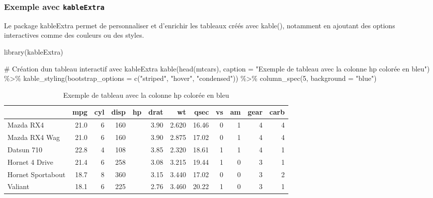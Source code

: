 \documentclass[
  letterpaper,
  DIV=11,
  numbers=noendperiod]{scrreprt}
\newenvironment{Shaded}{\begin{snugshade}}{\end{snugshade}}
\newcommand{\AttributeTok}[1]{\textcolor[rgb]{0.40,0.45,0.13}{#1}}
\newcommand{\CommentTok}[1]{\textcolor[rgb]{0.37,0.37,0.37}{#1}}
\newcommand{\DecValTok}[1]{\textcolor[rgb]{0.68,0.00,0.00}{#1}}
\newcommand{\FunctionTok}[1]{\textcolor[rgb]{0.28,0.35,0.67}{#1}}
\newcommand{\NormalTok}[1]{\textcolor[rgb]{0.00,0.23,0.31}{#1}}
\newcommand{\SpecialCharTok}[1]{\textcolor[rgb]{0.37,0.37,0.37}{#1}}
\newcommand{\StringTok}[1]{\textcolor[rgb]{0.13,0.47,0.30}{#1}}
\begin{document}
\hypertarget{exemple-avec-kableextra}{%
\subsubsection{\texorpdfstring{Exemple avec
\texttt{kableExtra}}{Exemple avec kableExtra}}\label{exemple-avec-kableextra}}

Le package kableExtra permet de personnaliser et d'enrichir les tableaux
créés avec kable(), notamment en ajoutant des options interactives comme
des couleurs ou des styles.

\begin{Shaded}
\begin{Highlighting}[]
\FunctionTok{library}\NormalTok{(kableExtra)}
\end{Highlighting}
\end{Shaded}

\begin{Shaded}
\begin{Highlighting}[]
\CommentTok{\# Création d\textquotesingle{}un tableau interactif avec kableExtra}
\FunctionTok{kable}\NormalTok{(}\FunctionTok{head}\NormalTok{(mtcars), }\AttributeTok{caption =} \StringTok{"Exemple de tableau avec la colonne hp colorée en bleu"}\NormalTok{) }\SpecialCharTok{\%\textgreater{}\%}
  \FunctionTok{kable\_styling}\NormalTok{(}\AttributeTok{bootstrap\_options =} \FunctionTok{c}\NormalTok{(}\StringTok{"striped"}\NormalTok{, }\StringTok{"hover"}\NormalTok{, }\StringTok{"condensed"}\NormalTok{)) }\SpecialCharTok{\%\textgreater{}\%}
  \FunctionTok{column\_spec}\NormalTok{(}\DecValTok{5}\NormalTok{, }\AttributeTok{background =} \StringTok{"blue"}\NormalTok{)}
\end{Highlighting}
\end{Shaded}

\begin{longtable}[t]{lrrr>{}rrrrrrrr}
\caption{Exemple de tableau avec la colonne hp colorée en bleu}\\
\toprule
 & mpg & cyl & disp & hp & drat & wt & qsec & vs & am & gear & carb\\
\midrule
Mazda RX4 & 21.0 & 6 & 160 & \cellcolor{blue}{110} & 3.90 & 2.620 & 16.46 & 0 & 1 & 4 & 4\\
Mazda RX4 Wag & 21.0 & 6 & 160 & \cellcolor{blue}{110} & 3.90 & 2.875 & 17.02 & 0 & 1 & 4 & 4\\
Datsun 710 & 22.8 & 4 & 108 & \cellcolor{blue}{93} & 3.85 & 2.320 & 18.61 & 1 & 1 & 4 & 1\\
Hornet 4 Drive & 21.4 & 6 & 258 & \cellcolor{blue}{110} & 3.08 & 3.215 & 19.44 & 1 & 0 & 3 & 1\\
Hornet Sportabout & 18.7 & 8 & 360 & \cellcolor{blue}{175} & 3.15 & 3.440 & 17.02 & 0 & 0 & 3 & 2\\
\addlinespace
Valiant & 18.1 & 6 & 225 & \cellcolor{blue}{105} & 2.76 & 3.460 & 20.22 & 1 & 0 & 3 & 1\\
\bottomrule
\end{longtable}
\end{document}
